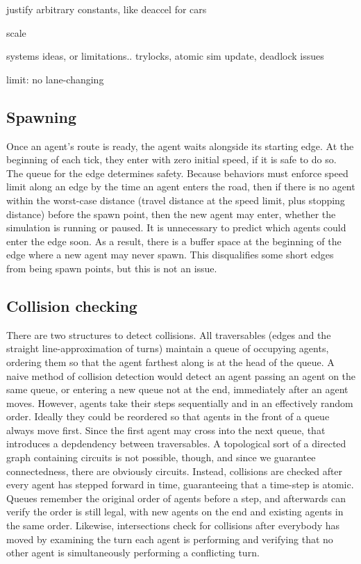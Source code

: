 \documentclass[letterpaper, 10 pt, conference]{ieeeconf}  %
\begin{document}
justify arbitrary constants, like deaccel for cars

scale

systems ideas, or limitations.. trylocks, atomic sim update, deadlock issues

limit: no lane-changing

\subsection{Spawning}


Once an agent's route is ready, the agent waits alongside its starting edge. At
the beginning of each tick, they enter with zero initial speed, if it is safe to
do so. The queue for the edge determines safety. Because behaviors must enforce
speed limit along an edge by the time an agent enters the road, then if there is
no agent within the worst-case distance (travel distance at the speed limit,
plus stopping distance) before the spawn point, then the new agent may enter,
whether the simulation is running or paused. It is unnecessary to predict which
agents could enter the edge soon. As a result, there is a buffer space at the
beginning of the edge where a new agent may never spawn. This disqualifies some
short edges from being spawn points, but this is not an issue.

\subsection{Collision checking}

There are two structures to detect collisions. All traversables (edges and the
straight line-approximation of turns) maintain a queue of occupying agents,
ordering them so that the agent farthest along is at the head of the queue.
A naive method of collision detection would detect an agent passing an agent on
the same queue, or entering a new queue not at the end, immediately after an
agent moves. However, agents take their steps sequentially and in an effectively
random order. Ideally they could be reordered so that agents in the front of a
queue always move first. Since the first agent may cross into the next queue,
that introduces a depdendency between traversables. A topological sort of a
directed graph containing circuits is not possible, though, and since we
guarantee connectedness, there are obviously circuits. Instead, collisions are
checked after every agent has stepped forward in time, guaranteeing that a
time-step is atomic. Queues remember the original order of agents before a step,
and afterwards can verify the order is still legal, with new agents on the end
and existing agents in the same order.  Likewise, intersections check for
collisions after everybody has moved by examining the turn each agent is
performing and verifying that no other agent is simultaneously performing a
conflicting turn.
\end{document}
